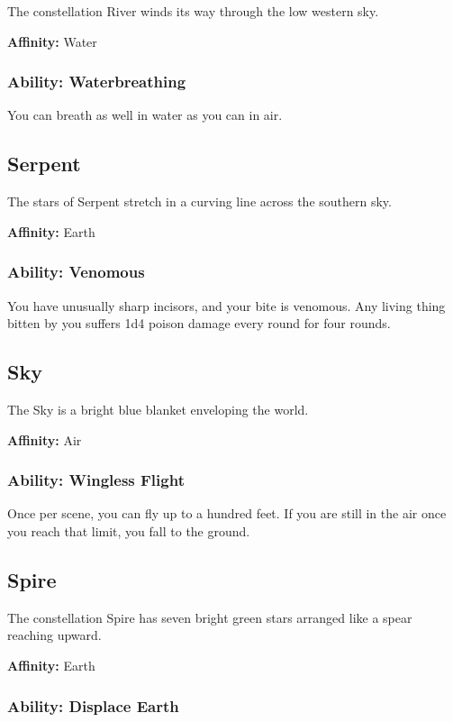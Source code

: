 \begin{multicols}{2}
The constellation River winds its way through the low western sky.

\textbf{Affinity:} Water

\subsubsection{Ability: Waterbreathing}

You can breath as well in water as you can in air.

\subsection{Serpent}

The stars of Serpent stretch in a curving line across the
southern sky.

\textbf{Affinity:} Earth

\subsubsection{Ability: Venomous}

You have unusually sharp incisors, and your bite is venomous. Any
living thing bitten by you suffers 1d4 poison damage every round for
four rounds.

\subsection{Sky}

The Sky is a bright blue blanket enveloping the world.

\textbf{Affinity:} Air

\subsubsection{Ability: Wingless Flight}

Once per scene, you can fly up to a hundred feet. If you are
still in the air once you reach that limit, you fall to the ground.

\subsection{Spire}

The constellation Spire has seven bright green stars arranged
like a spear reaching upward.

\textbf{Affinity:} Earth

\subsubsection{Ability: Displace Earth}


\end{multicols}
